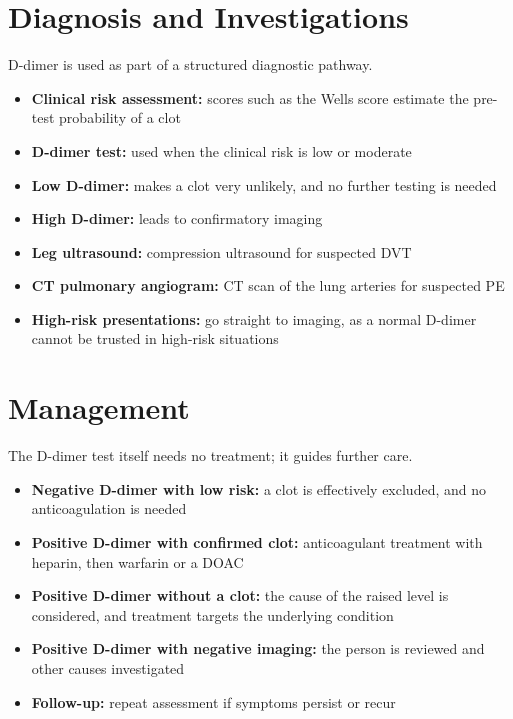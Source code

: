 \section*{Diagnosis and Investigations}
D-dimer is used as part of a structured diagnostic pathway.

\begin{itemize}
    \item \textbf{Clinical risk assessment:} scores such as the Wells score estimate the pre-test probability of a clot
    \item \textbf{D-dimer test:} used when the clinical risk is low or moderate
    \item \textbf{Low D-dimer:} makes a clot very unlikely, and no further testing is needed
    \item \textbf{High D-dimer:} leads to confirmatory imaging
    \item \textbf{Leg ultrasound:} compression ultrasound for suspected DVT
    \item \textbf{CT pulmonary angiogram:} CT scan of the lung arteries for suspected PE
    \item \textbf{High-risk presentations:} go straight to imaging, as a normal D-dimer cannot be trusted in high-risk situations
\end{itemize}

\section*{Management}
The D-dimer test itself needs no treatment; it guides further care.

\begin{itemize}
    \item \textbf{Negative D-dimer with low risk:} a clot is effectively excluded, and no anticoagulation is needed
    \item \textbf{Positive D-dimer with confirmed clot:} anticoagulant treatment with heparin, then warfarin or a DOAC
    \item \textbf{Positive D-dimer without a clot:} the cause of the raised level is considered, and treatment targets the underlying condition
    \item \textbf{Positive D-dimer with negative imaging:} the person is reviewed and other causes investigated
    \item \textbf{Follow-up:} repeat assessment if symptoms persist or recur
\end{itemize}

